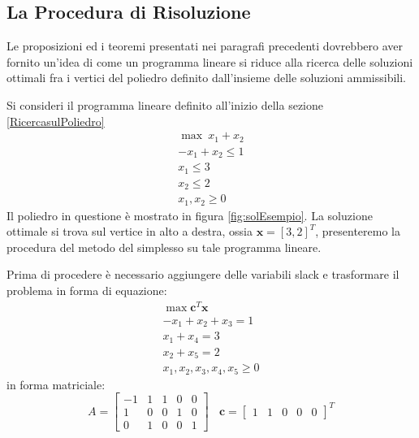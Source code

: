 \documentclass[10pt, letterpaper]{report}
\begin{document}
\subsection{La Procedura di Risoluzione}
Le proposizioni ed i teoremi presentati nei paragrafi precedenti dovrebbero aver fornito un'idea di come un programma lineare si riduce alla ricerca delle soluzioni ottimali fra i vertici del poliedro definito dall'insieme delle soluzioni ammissibili.

Si consideri il programma lineare definito all'inizio della sezione \ref{RicercasulPoliedro} 
$$\begin{matrix}
    \max \ x_1+x_2\\ -x_1+x_2\le 1 \\ x_1\le 3 \\ x_2 \le 2 \\ x_1,x_2 \ge 0
\end{matrix}$$
Il poliedro in questione è mostrato in figura \ref{fig:solEsempio}. La soluzione ottimale si trova sul vertice in alto a destra, ossia $\mathbf x = [3,2]^T$, presenteremo la procedura del metodo del simplesso su tale programma lineare.

Prima di procedere è necessario aggiungere delle variabili slack e trasformare il problema in forma di equazione:
$$\begin{matrix}
    \max \mathbf{c}^T \mathbf x  \ \\ -x_1+x_2+x_3= 1 \\ x_1+x_4= 3 \\ x_2 +x_5= 2 \\ x_1,x_2,x_3,x_4,x_5 \ge 0
\end{matrix}$$
in forma matriciale:
$$A=\begin{bmatrix}
    -1&1&1&0&0\\ 
    1&0&0&1&0 \\ 
    0& 1 & 0 & 0 & 1
\end{bmatrix}  \ \ \ \ \mathbf c = \begin{bmatrix}
    1 & 1 & 0&0&0
\end{bmatrix}^T$$
\end{document}

